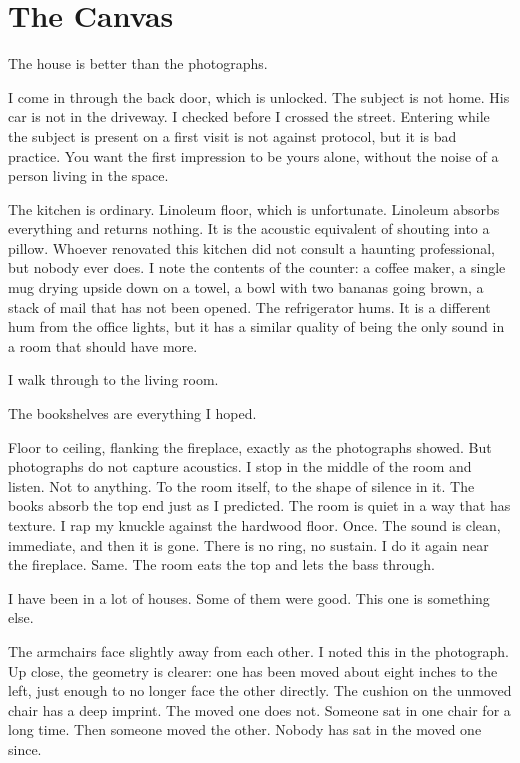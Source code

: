 
\chapter{The Canvas}

The house is better than the photographs.

I come in through the back door, which is unlocked. The subject is not home. His car is not in the driveway. I checked before I crossed the street. Entering while the subject is present on a first visit is not against protocol, but it is bad practice. You want the first impression to be yours alone, without the noise of a person living in the space.

The kitchen is ordinary. Linoleum floor, which is unfortunate. Linoleum absorbs everything and returns nothing. It is the acoustic equivalent of shouting into a pillow. Whoever renovated this kitchen did not consult a haunting professional, but nobody ever does. I note the contents of the counter: a coffee maker, a single mug drying upside down on a towel, a bowl with two bananas going brown, a stack of mail that has not been opened. The refrigerator hums. It is a different hum from the office lights, but it has a similar quality of being the only sound in a room that should have more.

I walk through to the living room.

The bookshelves are everything I hoped.

Floor to ceiling, flanking the fireplace, exactly as the photographs showed. But photographs do not capture acoustics. I stop in the middle of the room and listen. Not to anything. To the room itself, to the shape of silence in it. The books absorb the top end just as I predicted. The room is quiet in a way that has texture. I rap my knuckle against the hardwood floor. Once. The sound is clean, immediate, and then it is gone. There is no ring, no sustain. I do it again near the fireplace. Same. The room eats the top and lets the bass through.

I have been in a lot of houses. Some of them were good. This one is something else.

The armchairs face slightly away from each other. I noted this in the photograph. Up close, the geometry is clearer: one has been moved about eight inches to the left, just enough to no longer face the other directly. The cushion on the unmoved chair has a deep imprint. The moved one does not. Someone sat in one chair for a long time. Then someone moved the other. Nobody has sat in the moved one since.

